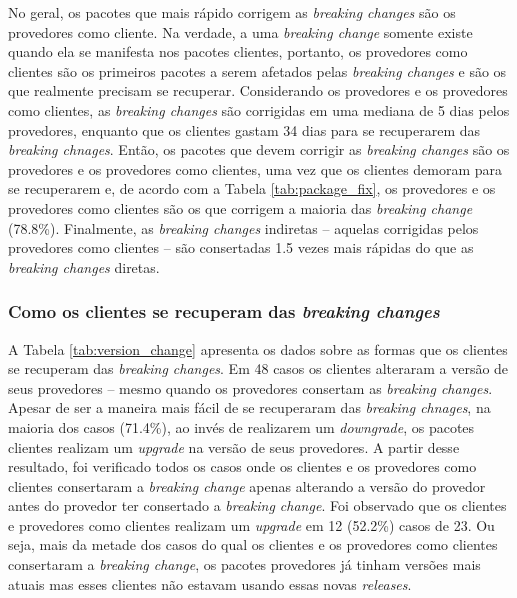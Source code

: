 No geral, os pacotes que mais rápido corrigem as \textit{breaking changes} são os provedores como cliente. Na verdade, a uma \textit{breaking change} somente existe quando ela se manifesta nos pacotes clientes, portanto, os provedores como clientes são os primeiros pacotes a serem afetados pelas \textit{breaking changes} e são os que realmente precisam se recuperar. Considerando os provedores e os provedores como clientes, as \textit{breaking changes} são corrigidas em uma mediana de 5 dias pelos provedores, enquanto que os clientes gastam 34 dias para se recuperarem das \textit{breaking chnages}. Então, os pacotes que devem corrigir as \textit{breaking changes} são os provedores e os provedores como clientes, uma vez que os clientes demoram para se recuperarem e, de acordo com a Tabela \ref{tab:package_fix}, os provedores e os provedores como clientes são os que corrigem a maioria das \textit{breaking change} (78.8\%). Finalmente, as \textit{breaking changes} indiretas -- aquelas corrigidas pelos provedores como clientes -- são consertadas 1.5 vezes mais rápidas do que as \textit{breaking changes} diretas.

\subsubsection{Como os clientes se recuperam das \textit{breaking changes}}

A Tabela \ref{tab:version_change} apresenta os dados sobre as formas que os clientes se recuperam das \textit{breaking changes}. Em 48 casos os clientes alteraram a versão de seus provedores -- mesmo quando os provedores consertam as \textit{breaking changes}. Apesar de ser a maneira mais fácil de se recuperaram das \textit{breaking chnages}, na maioria dos casos (71.4\%), ao invés de realizarem um \textit{downgrade}, os pacotes clientes realizam um \textit{upgrade} na versão de seus provedores. A partir desse resultado, foi verificado todos os casos onde os clientes e os provedores como clientes consertaram a \textit{breaking change} apenas alterando a versão do provedor antes do provedor ter consertado a \textit{breaking change}. Foi observado que os clientes e provedores como clientes realizam um \textit{upgrade} em 12 (52.2\%) casos de 23. Ou seja, mais da metade dos casos do qual os clientes e os provedores como clientes consertaram a \textit{breaking change}, os pacotes provedores já tinham versões mais atuais mas esses clientes não estavam usando essas novas \textit{releases}.

